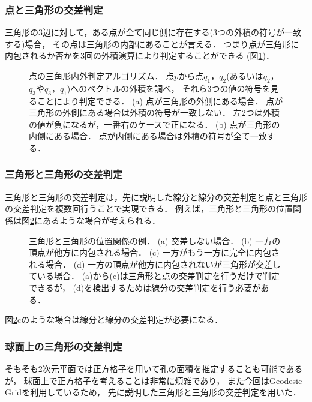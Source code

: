 \subsubsection{点と三角形の交差判定}
三角形の3辺に対して，ある点が全て同じ側に存在する(3つの外積の符号が一致する)場合，
その点は三角形の内部にあることが言える．
つまり点が三角形に内包されるか否かを3回の外積演算により判定することができる
(図\ref{fig:point_triangle})．
\begin{figure}
    \centering
    
    \caption{
        点の三角形内外判定アルゴリズム．
        点$p$から点$q_1$，$q_2$(あるいは$q_2$，$q_3$や$q_3$，$q_1$)へのベクトルの外積を調べ，
        それら3つの値の符号を見ることにより判定できる．
        (a) 点が三角形の外側にある場合．
            点が三角形の外側にある場合は外積の符号が一致しない．
            左2つは外積の値が負になるが，一番右のケースで正になる．
        (b) 点が三角形の内側にある場合．
            点が内側にある場合は外積の符号が全て一致する．
    }
    \label{fig:point_triangle}
\end{figure}


\subsubsection{三角形と三角形の交差判定}
三角形と三角形の交差判定は，先に説明した線分と線分の交差判定と点と三角形の交差判定を複数回行うことで実現できる．
例えば，三角形と三角形の位置関係は図\ref{fig:triangle_triangle}にあるような場合が考えられる．
\begin{figure}
    \centering
    
    \caption{
        三角形と三角形の位置関係の例．
        (a) 交差しない場合．
        (b) 一方の頂点が他方に内包される場合．
        (c) 一方がもう一方に完全に内包される場合．
        (d) 一方の頂点が他方に内包されないが三角形が交差している場合．
            (a)から(c)は三角形と点の交差判定を行うだけで判定できるが，
            (d)を検出するためは線分の交差判定を行う必要がある．
    }
    \label{fig:triangle_triangle}
\end{figure}
図\ref{fig:triangle_triangle}cのような場合は線分と線分の交差判定が必要になる．


\subsubsection{球面上の三角形の交差判定}
そもそも2次元平面では正方格子を用いて孔の面積を推定することも可能であるが，
球面上で正方格子を考えることは非常に煩雑であり，
また今回はGeodesic Gridを利用しているため，
先に説明した三角形と三角形の交差判定を用いた．

